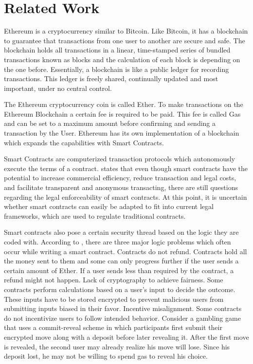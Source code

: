 \chapter{Related Work}\label{chap:relatedwork}
\chapterstart

Ethereum is a cryptocurrency similar to Bitcoin. Like Bitcoin, it has a blockchain to guarantee that transactions from one user to another are secure and safe. The blockchain holds all transactions in a linear, time-stamped series of bundled transactions known as blocks and the calculation of each block is depending on the one before. Essentially, a blockchain is like a public ledger for recording transactions. This ledger is freely shared, continually updated and most important, under no central control.

The Ethereum cryptocurrency coin is called Ether. To make transactions on the Ethereum Blockchain a certain fee is required to be paid. This fee is called Gas and can be set to a maximum amount before confirming and sending a transaction by the User.
Ethereum has its own implementation of a blockchain which expands the capabilities with Smart Contracts.

Smart Contracts are computerized transaction protocols which autonomously execute the terms of a contract. \citep[cf.]{Giancaspro:2017} states that even though smart contracts have the potential to increase commercial efficiency, reduce transaction and legal costs, and facilitate transparent and anonymous transacting, there are still questions regarding the legal enforceability of smart contracts. At this point, it is uncertain whether smart contracts can easily be adapted to fit into current legal frameworks, which are used to regulate traditional contracts.

Smart contracts also pose a certain security thread based on the logic they are coded with. According to \citep[cf.]{DAKMS:2015}, there are three major logic problems which often occur while writing a smart contract. 
Contracts do not refund. Contracts hold all the money sent to them and some can only progress further if the user sends a certain amount of Ether. If a user sends less than required by the contract, a refund might not happen.
Lack of cryptography to achieve fairness. Some contracts perform calculations based on a user’s input to decide the outcome. These inputs have to be stored encrypted to prevent malicious users from submitting inputs biased in their favor. 
Incentive misalignment. Some contracts do not incentivize users to follow intended behavior. Consider a gambling game that uses a commit-reveal scheme in which participants first submit their encrypted move along with a deposit before later revealing it. After the first move is revealed, the second user may already realize his move will lose. Since his deposit lost, he may not be willing to spend gas to reveal his choice.
    
